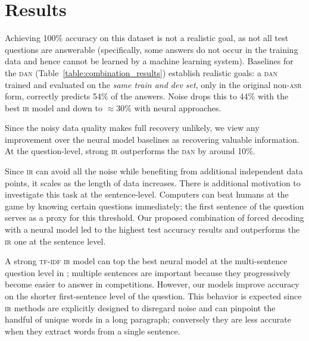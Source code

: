 \section{Results}
\label{sec:exp}


Achieving 100\% accuracy on this dataset is not a realistic goal, as
not all test questions are answerable (specifically, some answers do
not occur in the training data and hence cannot be
learned by a machine learning system).  Baselines for the \textsc{dan} (Table~\ref{table:combination_results}) establish realistic goals: a \textsc{dan} trained and evaluated on the \textit{same train and dev set}, only in the original
non-\textsc{asr} form, correctly predicts 54\% of the
answers. Noise drops this to 44\% with the best \textsc{ir} model and down
to $\approx30\%$  with neural approaches.


Since the noisy data quality makes full recovery unlikely, we view any
improvement over the neural model baselines as recovering valuable
information.  At the question-level, strong \textsc{ir} outperforms
the \textsc{dan} by around 10\%.

Since \textsc{ir} can avoid all the noise while benefiting from additional independent data points, it
scales as the length of data increases.  There is additional motivation to investigate this task at the
sentence-level.  Computers can beat humans at the game by knowing certain questions immediately; the first sentence of the \qb{} question serves as a proxy for this threshold.  Our proposed combination of forced decoding with a neural model led to the highest test accuracy results and outperforms the \textsc{ir} one at the sentence level.


A strong \textsc{tf-idf} \textsc{ir} model can top the best neural model at the multi-sentence question level in \qb{}; multiple sentences are important because they progressively become easier to answer in competitions.  However, our models improve accuracy on the shorter first-sentence level of the question.  This behavior is expected since \textsc{ir} methods are explicitly designed to disregard noise and can pinpoint the handful of unique words in a long paragraph; conversely they are less accurate when they extract words from a single sentence.




